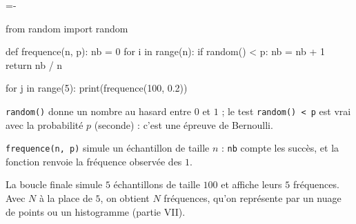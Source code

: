 \documentclass[11pt,a4paper]{article}
\makeatletter
\newcommand{\besoinplace}[1]{\par\penalty\@M\begingroup
  \dimen@=#1\relax\dimen@ii=\pagegoal\advance\dimen@ii-\pagetotal
  \ifdim\dimen@>\dimen@ii\ifdim\dimen@ii>\z@\vfil\fi\break\fi\endgroup}
\makeatother
\begin{document}
\besoinplace{14\baselineskip}
\begin{remarquebox}[En Python]
\begin{minipage}[t]{0.46\linewidth}\vspace{0pt}
\begin{python}
from random import random

def frequence(n, p):
    nb = 0
    for i in range(n):
        if random() < p:
            nb = nb + 1
    return nb / n

for j in range(5):
    print(frequence(100, 0.2))
\end{python}
\end{minipage}\hfill
\begin{minipage}[t]{0.50\linewidth}\vspace{0pt}\raggedright
\texttt{random()} donne un nombre au hasard entre $0$ et $1$ ; le test
\texttt{random() < p} est vrai avec la probabilité $p$ (seconde) : c'est une épreuve
de Bernoulli.

\smallskip
\texttt{frequence(n, p)} simule un échantillon de taille $n$ : \texttt{nb} compte les
succès, et la fonction renvoie la fréquence observée des $1$.

\smallskip
La boucle finale simule $5$ échantillons de taille $100$ et affiche leurs $5$ fréquences.
Avec $N$ à la place de $5$, on obtient $N$ fréquences, qu'on représente par un nuage de
points ou un histogramme (partie VII).
\end{minipage}
\end{remarquebox}
\end{document}
